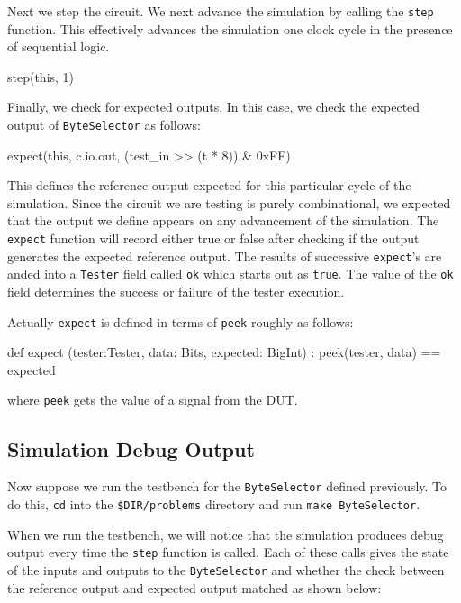 Next we step the circuit.  We next advance the simulation by calling the \verb+step+ function. This effectively advances the simulation one clock cycle in the presence of sequential logic. 

\begin{stanza}
step(this, 1)
\end{stanza}

Finally, we check for expected outputs.
In this case, we check the expected output of \verb+ByteSelector+ as follows:

\begin{stanza}
expect(this, c.io.out, (test_in >> (t * 8)) & 0xFF)
\end{stanza}

This defines the reference output expected for this particular cycle of the simulation. Since the circuit we are testing is purely combinational, we expected that the output we define appears on any advancement of the simulation.  The \verb+expect+ function will record either true or false after checking if the output generates the expected reference output. The results of successive \verb+expect+'s are anded into a \verb+Tester+ field called \verb+ok+ which starts out as \verb+true+.  The value of the \verb+ok+ field determines the success or failure of the tester execution.

Actually \verb+expect+ is defined in terms of \verb+peek+ roughly as follows:

\begin{stanza}
def expect (tester:Tester, data: Bits, expected: BigInt) :
  peek(tester, data) == expected
\end{stanza}

where \verb+peek+ gets the value of a signal from the DUT.

\subsection{Simulation Debug Output}

Now suppose we run the testbench for the \verb+ByteSelector+ defined previously. To do this, \verb+cd+ into the \verb+$DIR/problems+ directory and run \verb+make ByteSelector+.

When we run the testbench, we will notice that the simulation produces debug output every time the \verb+step+ function is called. Each of these calls gives the state of the inputs and outputs to the \verb+ByteSelector+ and whether the check between the reference output and expected output matched as shown below:

